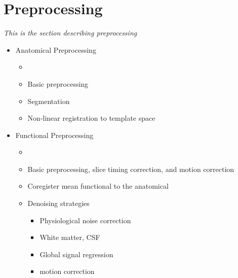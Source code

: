 \section{Preprocessing}
\textit{This is the section describing preprocessing}

\begin{itemize}
    \item Anatomical Preprocessing
    \begin{itemize}
        \item 
        \item Basic preprocessing
        \item Segmentation
        \item Non-linear registration to template space
    \end{itemize}
    \item Functional Preprocessing
    \begin{itemize}
        \item 
        \item Basic preprocessing, slice timing correction, and motion correction
        \item Coregister mean functional to the anatomical
        \item Denoising strategies
        \begin{itemize}
            \item Physiological noise correction
            \item White matter, CSF
            \item Global signal regression
            \item motion correction
        \end{itemize}
    \end{itemize}
\end{itemize}
